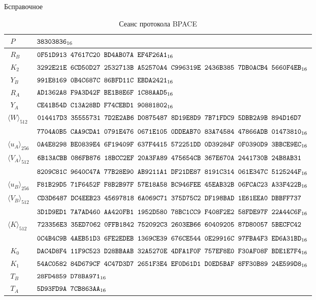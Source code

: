 \begin{appendix}{Б}{справочное}
\begin{table}[H]
\caption{Сеанс протокола BPACE}\label{Table.TEST.PACE}
{\small
\begin{tabular}{|l|l|}
\hline
$\phantom{\langle}P$ & 
$\texttt{38303836}_{16}$\\
\hline
%
\hline
$\phantom{\langle}R_B$ & 
$\texttt{0F51D913~47617C20~BD4AB07A~EF4F26A1}_{16}$\\
%
\hline
$\phantom{\langle}K_2$ & 
$\texttt{3292E21E~6CD50D27~2532713B~A52570A4~C996319E~2436B385~7DB0ACB4~5660F4EB}_{16}$\\
%
\hline
$\phantom{\langle}Y_B$ & 
$\texttt{991E8169~0B4C687C~86BFD11C~EBDA2421}_{16}$\\
%
\hline
\hline
%
$\phantom{\langle}R_A$ & 
$\texttt{AD1362A8~F9A3D42F~BE1B8E6F~1C88AAD5}_{16}$\\
%
\hline
$\phantom{\langle}Y_A$ & 
$\texttt{CE41B54D~C13A28BD~F74CEBD1~90881802}_{16}$\\
%
\hline
$\langle W\rangle_{512}$ & 
$\texttt{014417D3~35555731~7D2E2AB6~D0875487~8D19E8D9~7B71FDC9~5DBB2A9B~894D16D7}$\\
& 
$\texttt{7704A0B5~CAA9CDA1~0791E476~0671E105~0DDEAB70~83A74584~47866ADB~01473810}_{16}$\\
%
\hline
$\langle u_A\rangle_{256}$ & 
$\texttt{0A4E8298~BE0839E4~6F19409F~637F4415~572251DD~0D39284F~0F0390D9~3BBCE9EC}_{16}$\\
%
\hline
$\langle V_A\rangle_{512}$ & 
$\texttt{6B13ACBB~086FB876~18BCC2EF~20A3FA89~475654CB~367E670A~2441730B~24B8AB31}$\\
& 
$\texttt{8209C81C~9640C47A~77B28E90~AB9211A1~DF21DE87~8191C314~061E347C~5125244F}_{16}$\\
%
\hline
\hline
%
$\langle u_B\rangle_{256}$ & 
$\texttt{F81B29D5~71F6452F~F8B2B97F~57E18A58~BC946FEE~45EAB32B~06FCAC23~A33F422B}_{16}$\\
%
\hline
$\langle V_B\rangle_{512}$ & 
$\texttt{CD3D6487~DC4EEB23~45697818~6A069C71~375D75C2~DF198BAD~1E61EEA0~DBBFF737}$\\
& 
$\texttt{3D1D9ED1~7A7AD460~AA420FB1~1952D580~78BC1CC9~F408F2E2~58FDE97F~22A44C6F}_{16}$\\
%
\hline
$\langle K\rangle_{512}$ & 
$\texttt{723356E3~35ED7062~0FFB1842~752092C3~2603EB66~60409205~87D80057~5BECFC42}$\\
& 
$\texttt{0C4B4C9B~4AEB51D3~6FE2EDEB~1369CE39~676CE544~0E29916C~97FBA4F3~ED6A31BD}_{16}$\\
%
\hline
$\phantom{\langle}K_0$ & 
$\texttt{DAC4D8F4~11F9C523~D28BBAAB~32A5270E~4DFA1F0F~757EF8E0~F30AF08F~BDE1E7F4}_{16}$\\
%
\hline
$\phantom{\langle}K_1$ & 
$\texttt{54AC0582~84D679CF~4C47D3D7~2651F3E4~EF0D61D1~D0ED5BAF~8FF30B89~24E599D8}_{16}$\\
%
\hline
$\phantom{\langle}T_B$ & 
$\texttt{28FD4859~D78BA971}_{16}$\\
%
\hline
\hline
%
$\phantom{\langle}T_A$ & 
$\texttt{5D93FD9A~7CB863AA}_{16}$\\
\hline
\end{tabular}
}
\end{table}

\end{appendix}

\mbox{}
\vfill
\mbox{}
\clearpage

